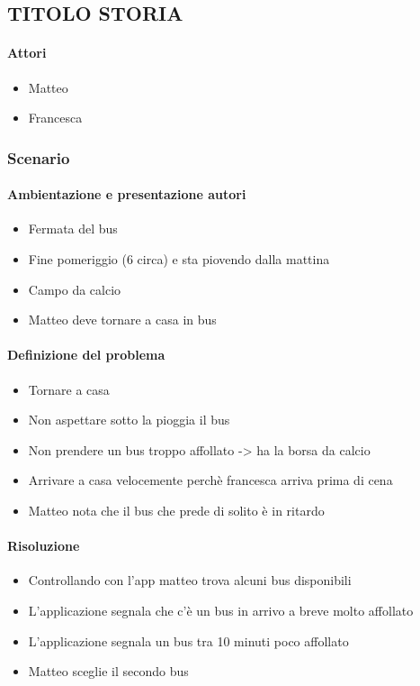 \documentclass[../../UUX_Personas.tex]{subfiles}
\begin{document}
	\subsection{TITOLO STORIA}
	\paragraph{Attori}
	\begin{itemize}
		\item Matteo
		\item Francesca
	\end{itemize}

	\subsubsection{Scenario} 
	\paragraph{Ambientazione e presentazione autori}
	\begin{itemize}
		\item Fermata del bus
		\item Fine pomeriggio (6 circa) e sta piovendo dalla mattina
		\item Campo da calcio 
		\item Matteo deve tornare a casa in bus
	\end{itemize}
	\paragraph{Definizione del problema}
	\begin{itemize}
		\item Tornare a casa
		\item Non aspettare sotto la pioggia il bus
		\item Non prendere un bus troppo affollato -> ha la borsa da calcio
		\item Arrivare a casa velocemente perchè francesca arriva prima di cena
		\item Matteo nota che il bus che prede di solito è in ritardo
	\end{itemize}
	\paragraph{Risoluzione}
	\begin{itemize}
		\item Controllando con l'app matteo trova alcuni bus disponibili
		\item L'applicazione segnala che c'è un bus in arrivo a breve molto affollato
		\item L'applicazione segnala un bus tra 10 minuti poco affollato
		\item Matteo sceglie il secondo bus
	\end{itemize}
\end{document}
